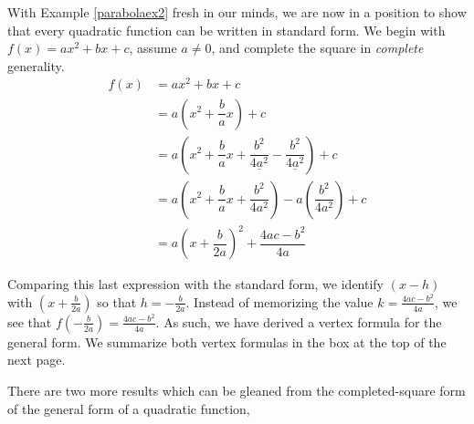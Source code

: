 \medskip

With Example \ref{parabolaex2} fresh in our minds, we are now in a position to show that every quadratic function can be written in standard form.  We begin with $f(x) = ax^2+bx+c$, assume $a \neq 0$, and complete the square in \textit{complete} generality. 
\begin{align*}
f(x) & =  ax^2 + bx + c  \\
& =  a\left(x^2 + \dfrac{b}{a} x\right) + c  \tag*{(Factor out coefficient of $x^2$ from $x^2$ and $x$.)} \\
& =   a\left(x^2 + \dfrac{b}{a} x + \underline{\dfrac{b^{2}}{4a^2}} - \underline{\dfrac{b^{2}}{4a^2}} \right) + c   \\
& =   a\left(x^2 + \dfrac{b}{a} x + \dfrac{b^{2}}{4a^2} \right)  - a \left(\dfrac{b^{2}}{4a^2}\right) + c   \tag*{(Group the perfect square trinomial.)} \\ 
& =  a\left(x+\dfrac{b}{2a}\right)^2 + \dfrac{4ac - b^2}{4a}  \tag*{(Factor and get a common denominator.)}
\end{align*}

Comparing this last expression with the standard form, we identify $(x-h)$ with $\left(x+\frac{b}{2a}\right)$ so that $h = -\frac{b}{2a}$. Instead of memorizing the value $k = \frac{4ac - b^2}{4a}$, we see that $f\left(-\frac{b}{2a}\right) = \frac{4ac - b^2}{4a}$.  As such, we have derived a vertex formula for the general form.  We summarize both vertex formulas in the box at the top of the next page. 


\smallskip


\smallskip

There are two more results which can be gleaned from the completed-square form of the general form of a quadratic function,

